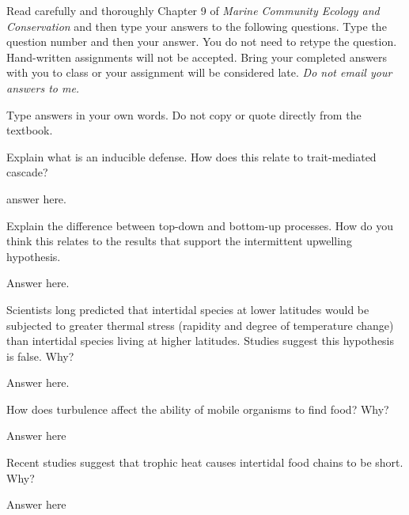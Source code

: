 \documentclass[12pt]{exam}
\newcommand*\AnswerBox[2]{%
    \parbox[t][#1]{0.92\textwidth}{%
    \begin{solution}#2\end{solution}}
}
\begin{document}
Read carefully and thoroughly Chapter 9 of \textit{Marine Community Ecology and Conservation}  and then type your answers to the following questions.
Type the question number and then your answer. You do not need to retype the question. Hand-written
assignments will not be accepted. Bring your completed answers
with you to class or your assignment will be considered late. \emph{Do not email your answers to me.}

Type answers in your own words. Do not copy or quote directly from the textbook.

\begin{questions}

\question[5]
Explain what is an inducible defense. How does this relate to trait-mediated cascade?

\AnswerBox{4\baselineskip}{%
answer here.
}
%
\question[5]
Explain the difference between top-down and bottom-up processes.  How do you think this relates to the results that support the intermittent upwelling hypothesis.

\AnswerBox{4\baselineskip}{%
Answer here.
}
%
\question[5]
Scientists long predicted that intertidal species at lower latitudes would be subjected to greater thermal stress (rapidity and degree of temperature change) than intertidal species living at higher latitudes. Studies suggest this hypothesis is false. Why? 

\AnswerBox{4\baselineskip}{%
Answer here.
}
%

\question[3]
How does turbulence affect the ability of mobile organisms to find food? Why?

\AnswerBox{4\baselineskip}{%
Answer here
}

\question[2]
Recent studies suggest that trophic heat causes intertidal food chains to be short. Why?

\AnswerBox{\baselineskip}{%
Answer here
}

\end{questions}
\end{document}
